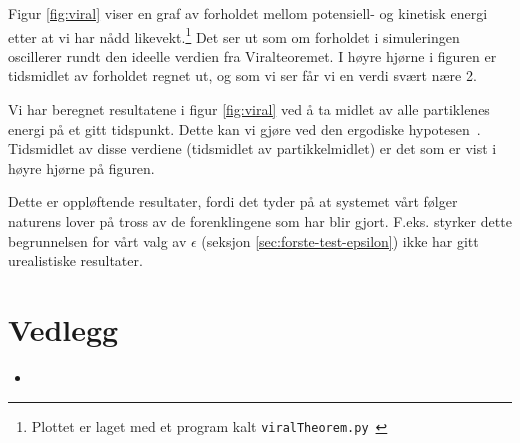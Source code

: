 \documentclass[11pt]{article}
\begin{document}
\begin{multicols*}{2}

Figur \ref{fig:viral} viser en graf av forholdet mellom potensiell- og
kinetisk energi etter at vi har nådd likevekt.\footnote{Plottet er
  laget med et program kalt
  \texttt{viralTheorem.py}~\cite{github-repo}} Det ser ut som om
forholdet i simuleringen oscillerer rundt den ideelle verdien fra
Viralteoremet. I høyre hjørne i figuren er tidsmidlet av forholdet
regnet ut, og som vi ser får vi en verdi svært nære 2. 

Vi har beregnet resultatene i figur \ref{fig:viral} ved å ta midlet av
alle partiklenes energi på et gitt tidspunkt. Dette kan vi gjøre ved
den ergodiske hypotesen~\cite{ergodisk-hypotese}. Tidsmidlet av disse
verdiene (tidsmidlet av partikkelmidlet) er det som er vist i høyre
hjørne på figuren.

Dette er oppløftende resultater, fordi det tyder på at systemet vårt følger
naturens lover på tross av de forenklingene som har blir
gjort. F.eks. styrker dette begrunnelsen for vårt valg av $\epsilon$
(seksjon \ref{sec:forste-test-epsilon}) ikke har gitt urealistiske
resultater. 




\end{multicols*}
\clearpage
\printbibliography
\clearpage
\section{Vedlegg}
\begin{itemize}
  \item[]
\end{itemize}
\end{document}
